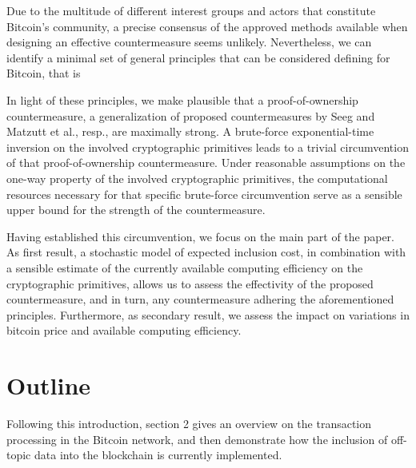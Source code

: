 \documentclass[a4paper,11pt,titlepage]{scrbook}
\begin{document}
Due to the multitude of different interest groups and actors that constitute Bitcoin's community, a precise consensus of the approved methods available when designing an effective countermeasure seems unlikely.
Nevertheless, we can identify a minimal set of general principles that can be considered defining for Bitcoin,
that is 

In light of these principles, we make plausible that a proof-of-ownership countermeasure, a generalization of proposed countermeasures by Seeg and Matzutt et al.\@, resp., are maximally strong. 
A brute-force exponential-time inversion on the involved cryptographic primitives leads to a trivial circumvention of that proof-of-ownership countermeasure.
Under reasonable assumptions on the one-way property of the involved cryptographic primitives,
the computational resources necessary for that specific brute-force circumvention serve as a sensible upper bound for the strength of the countermeasure.

Having established this circumvention, we focus on the main part of the paper.
As first result, a stochastic model of expected inclusion cost, in combination with a sensible estimate of the currently available computing efficiency on the cryptographic primitives, allows us to assess the effectivity of the proposed countermeasure, and in turn, any countermeasure adhering the aforementioned principles.
Furthermore, as secondary result, we assess the impact on variations in bitcoin price and available computing efficiency.



\section{Outline}

Following this introduction, section 2 gives an overview on the transaction processing in the Bitcoin network, and then demonstrate how the inclusion of off-topic data into the blockchain is currently implemented.
\end{document}
